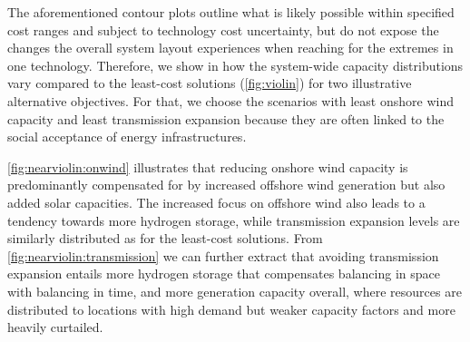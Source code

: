 
The aforementioned contour plots  outline
what is likely possible within specified cost ranges and subject to technology cost uncertainty,
but do not expose
the changes the overall system layout experiences when reaching for the extremes in one technology.
Therefore, we show in  how the system-wide capacity distributions vary
compared to the least-cost solutions (\cref{fig:violin}) for two illustrative alternative objectives.
For that, we choose the scenarios with least onshore wind capacity and least transmission expansion
because they are often linked to the social acceptance of energy infrastructures.

\cref{fig:nearviolin:onwind} illustrates that reducing onshore wind capacity is
predominantly compensated for by increased offshore wind generation but also added solar capacities.
The increased focus on offshore wind also leads to a tendency towards more hydrogen storage,
while transmission expansion levels are similarly distributed as for the least-cost solutions.
From \cref{fig:nearviolin:transmission} we can further extract that avoiding transmission expansion entails
more hydrogen storage that compensates balancing in space with balancing in time,
and more generation capacity overall, where resources are distributed to locations with
high demand but weaker capacity factors and more heavily curtailed.



